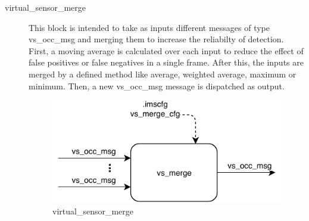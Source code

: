 \begin{description}
\item[virtual\_sensor\_merge] \hfill
This block is intended to take as inputs different messages of type vs\_occ\_msg and merging them to increase the reliabilty of detection. First, a moving average is calculated over each input to reduce the effect of false positives or false negatives in a single frame. After this, the inputs are merged by a defined method like average, weighted average, maximum or minimum. Then, a new vs\_occ\_msg message is dispatched as output.
\begin{figure}[ht!]
\centering
\includegraphics[scale=1]{fig/3/vs_merge.pdf}
\caption{virtual\_sensor\_merge}
\label{virtual_sensor_merge}
\end{figure}



\end{description}


